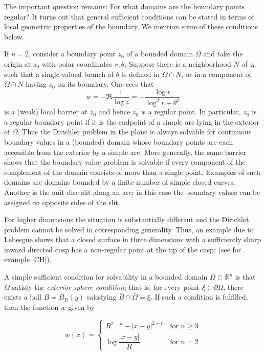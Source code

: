 \noindent The important question remains: For what domains are the boundary points regular? It turns out that general sufficient conditions can be stated in terms of local geometric properties of the boundary. We mention some of these conditions below.

\noindent If $n=2$, consider a boundary point $z_{0}$ of a bounded domain $\Omega$ and take the origin at $z_{0}$ with polar coordinates $r,\theta$. Suppose there is a neighborhood $N$ of $z_{0}$ such that a single valued branch of $\theta$ is defined in $\Omega\cap N$, or in a component of $\Omega\cap N$ having $z_{0}$ on its boundary. One sees that
\[
w=-\Re \frac{1}{\log z}=-\frac{\log r}{\log^{2} r+\theta^{2}}
\]
is a (weak) local barrier at $z_{0}$ and hence $z_{0}$ is a regular point. In particular, $z_{0}$ is a regular boundary point if it is the endpoint of a simple arc lying in the exterior of $\Omega$. Thus the Dirichlet problem in the plane is always solvable for continuous boundary values in a (bounded) domain whose boundary points are each accessible from the exterior by a simple arc. More generally, the same barrier shows that the boundary value problem is solvable if every component of the complement of the domain consists of more than a single point. Examples of such domains are domains bounded by a finite number of simple closed curves. Another is the unit disc slit along an arc; in this case the boundary values can be assigned on opposite sides of the slit.


For higher dimensions the situation is substantially different and the Dirichlet
problem cannot be solved in corresponding generality. Thus, an example due to
Lebesgue shows that a closed surface in three dimensions with a sufficiently sharp
inward directed cusp has a non-regular point at the tip of the cusp; (see for
example [CH]).

A simple sufficient condition for solvability in a bounded domain $\Omega \subset \mathbb{R}^n$ is
that $\Omega$ satisfy the \emph{exterior sphere condition}; that is, for every point $\xi \in \partial\Omega$, there
exists a ball $B = B_R(y)$ satisfying $\bar B \cap \bar\Omega = \xi$. If such a condition is fulfilled, then the
function $w$ given by

\begin{equation}
\tag{2.34}
w(x)=
\begin{cases}
R^{2-n}-|x-y|^{2-n} & \text{for } n \geq 3 \\
\log \dfrac{|x-y|}{R} & \text{for } n=2
\end{cases}
\end{equation}

